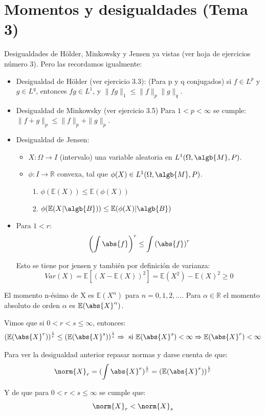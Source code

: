 \documentclass{apuntes}
\begin{document}
\chapter{Momentos y desigualdades (Tema 3)}
Desigualdades de Hölder, Minkowsky y Jensen ya vistas (ver hoja de ejercicios número 3). Pero las recordamos igualmente:
\begin{itemize}
\item Desigualdad de Hölder (ver ejercicio 3.3): (Para p y q conjugados) si $f\in L^p$ y $g\in L^q$, entonces $fg\in L^1$, y $\|fg\|_1 \le \|f\|_p\|g\|_q$.
\item Desigualdad de Minkowsky (ver ejercicio 3.5) Para $1<p<\infty$ se cumple:
 $\|f + g\|_p \le \|f\|_p + \|g\|_p$.
\item Desigualdad de Jensen:
\begin{itemize}
\item $X: \Omega \rightarrow I$ (intervalo) una variable aleatoria en $L^1(\Omega, \algb{M},P)$.
\item $\phi: I \rightarrow \mathbb{R}$ convexa, tal que $\phi(X) \in L^1(\Omega,\algb{M},P)$.
\begin{enumerate}
\item $\phi(\mathbb{E}(X)) \leq \mathbb{E}(\phi(X))$
\item $\phi(\mathbb{E}(X|\algb{B})) \leq \mathbb{E}(\phi(X)|\algb{B})$

\end{enumerate}


\end{itemize}
\item Para $1<r$:
$$\left(\int \abs{f}\right)^r \leq\int \left( \abs{f} \right)^r$$

Esto se tiene por jensen y también por definición de varianza:
\[
Var(X)=\mathbb{E}[(X-\mathbb{E}(X))^2] = \mathbb{E}(X^2) - \mathbb{E}(X)^2 \geq 0
\]
\end{itemize}


\begin{defn}
El momento n-ésimo de X es $\mathbb{E}(X^n)$ para $n=0,1,2,...$.  Para $\alpha \in \mathbb{R}$ el momento absoluto de orden $\alpha$ es $\mathbb{E}(\abs{X}^{\alpha})$.

Vimos que si $0 < r < s \leq \infty$, entonces:
\[
(\mathbb{E}(\abs{X}^r))^{\frac{1}{r}} \leq (\mathbb{E}(\abs{X}^s))^{\frac{1}{s}} \Rightarrow \text{ si } \mathbb{E}(\abs{X}^s) < \infty \Rightarrow \mathbb{E}(\abs{X}^r) < \infty
\]

\begin{expla}
Para ver la desigualdad anterior repasar normas y darse cuenta de que:
\[
\norm{X}_r = (\int \abs{X}^r)^{\frac{1}{r}} = (\mathbb{E}(\abs{X}^r))^{\frac{1}{r}}
\]

Y de que para $0 < r < s \leq \infty$ se cumple que:
\[
\norm{X}_r < \norm{X}_s
\]
\end{expla}
\end{defn}
\end{document}
